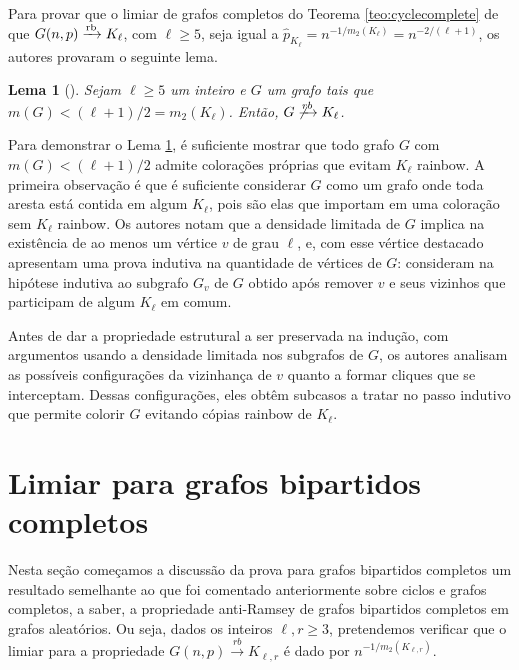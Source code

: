 \documentclass[12pt,a4paper]{book}
\newcommand{\K}{K_{\ell,r}} %
\def\rbarrow{\xrightarrow[]{\raisebox{0.0mm}[0mm]{$\scriptstyle \rm rb$}}}
\newtheorem{lema}      [teorema] {Lema}
\begin{document}
 
   Para provar que o limiar de grafos completos do Teorema \ref{teo:cyclecomplete} de que $G(n,p) \rbarrow K_\ell$, com $\ell \geq 5$, seja igual a $\hat{p}_{K_\ell} = n^{-1/m_2(K_\ell)} = n^{- 2/(\ell+1)}$, os autores provaram o seguinte lema.
   
   \begin{lema}[\cite{kohayakawa2019anti}]\label{lema:rbcomplete}
         Sejam $\ell \geq 5$ um inteiro e $G$ um grafo tais que 
         $m(G) < (\ell+1)/2 = m_2(K_\ell)$.
         Então, $G \not\xrightarrow[]{rb} K_\ell$.
    \end{lema}
    Para demonstrar o Lema \ref{lema:rbcomplete}, é suficiente mostrar que todo grafo $G$ com $m(G) < (\ell+1)/2$  admite colorações próprias que evitam $K_\ell$ rainbow. 
    A primeira observação é que é suficiente considerar $G$ como um grafo onde toda aresta está contida em algum $K_\ell$, pois são elas que importam em uma coloração sem $K_\ell$ rainbow. 
    Os autores notam que a densidade limitada de $G$ implica na existência de ao menos um vértice $v$ de grau $\ell$, e, com esse vértice destacado apresentam uma prova indutiva na quantidade de vértices de $G$: consideram na hipótese indutiva ao subgrafo $G_v$ de $G$ obtido após remover $v$ e seus vizinhos que participam de algum $K_\ell$ em comum.
    
    Antes de dar a propriedade estrutural a ser preservada na indução, com argumentos usando a densidade limitada nos subgrafos de $G$, os autores analisam as possíveis configurações da vizinhança de $v$ quanto a formar cliques que se interceptam. 
    Dessas configurações, eles obtêm subcasos a tratar no passo indutivo que permite colorir $G$ evitando cópias rainbow de $K_\ell$.
 
 
\section{Limiar para grafos bipartidos completos}

    Nesta seção começamos a discussão da prova para grafos bipartidos completos um resultado semelhante ao que foi comentado anteriormente sobre ciclos e grafos completos, a saber, a propriedade anti-Ramsey de grafos bipartidos completos em grafos aleatórios.
    Ou seja, dados os inteiros $\ell,r \geq 3$, pretendemos verificar que o limiar para a propriedade $G(n,p) \xrightarrow[]{rb} \K$ é dado por $n^{-1/m_2(\K)}$.
\end{document}
